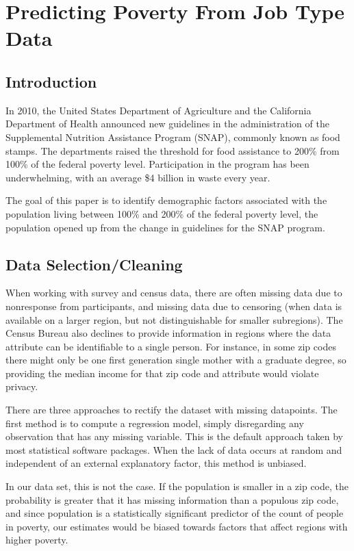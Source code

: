 

\chapter{Predicting Poverty From Job Type Data}
\section{Introduction}

In 2010, the United States Department of Agriculture and the California Department of Health announced new guidelines in the administration of the Supplemental Nutrition Assistance Program (SNAP), commonly known as food stamps. The departments raised the 
threshold for food assistance to 200\% from 100\% of the federal poverty level. Participation in the program has been underwhelming, with an average \$4 billion in waste every year.

The goal of this paper is to identify demographic factors associated with the population living between 100\% and 200\% of the federal poverty level, the population opened up from the change in guidelines for the SNAP program. 

\section{Data Selection/Cleaning}

When working with survey and census data, there are often missing data due to nonresponse from participants, and missing data due to censoring (when data is available on a larger region, but not distinguishable for smaller subregions). The Census Bureau also declines to provide information in regions where the data attribute can be identifiable to a single person. For instance, in some zip codes there might only be one first generation single mother with a graduate degree, so providing the median income for that zip code and attribute would violate privacy. 

There are three approaches to rectify the dataset with missing datapoints. The first method is to compute a regression model, simply disregarding any observation that has any missing variable. This is the default approach taken by most statistical software packages. When the lack of data occurs at random and independent of an external explanatory factor, this method is unbiased. 

In our data set, this is not the case. If the population is smaller in a zip code, the probability is greater that it has missing information than a populous zip code, and since population is a statistically significant predictor of the count of people in poverty, our estimates would be biased towards factors that affect regions with higher poverty.

